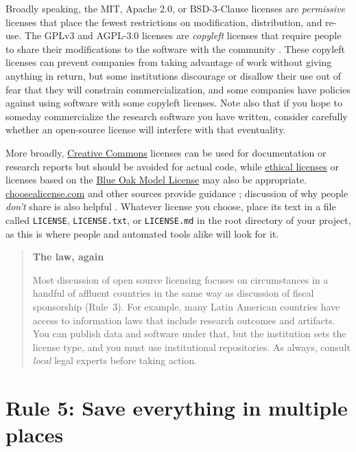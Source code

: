 \documentclass[10pt,letterpaper]{article}
\begin{document}
Broadly speaking,
the MIT, Apache 2.0, or BSD-3-Clause licenses are \emph{permissive} licenses
that place the fewest restrictions on modification, distribution, and re-use.
The GPLv3 and AGPL-3.0 licenses are \emph{copyleft} licenses
that require people to share their modifications to the software with the community \cite{Morin2012}.
These copyleft licenses can prevent companies from taking advantage of work without giving anything in return,
but some institutions discourage or disallow their use out of fear that they will constrain commercialization,
and some companies have policies against using software with some copyleft licenses.
Note also that if you hope to someday commercialize the research software you have written, consider carefully whether an open-source license will interfere with that eventuality.

More broadly,
\href{https://creativecommons.org/}{Creative Commons} licenses can be used for documentation or research reports
but should be avoided for actual code,
while \href{https://ethicalsource.dev/}{ethical licenses}
or licenses based on the \href{https://blueoakcouncil.org/license/1.0.0}{Blue Oak Model License} may also be appropriate.
\href{http://choosealicense.com}{choosealicense.com} and other sources provide guidance \cite{Fogel2020,Fortunato2021};
discussion of why people \emph{don't} share is also helpful \cite{Gomes2022}.
Whatever license you choose,
place its text in a file called \texttt{LICENSE}, \texttt{LICENSE.txt}, or \texttt{LICENSE.md}
in the root directory of your project,
as this is where people and automated tools alike will look for it.

\begin{quote}
  \noindent
  \textbf{The law, again}

  Most discussion of open source licensing focuses on circumstances in a handful of affluent countries
  in the same way as discussion of fiscal sponsorship (Rule~3).
  For example,
  many Latin American countries have access to information laws that include research outcomes and artifacts.
  You can publish data and software under that,
  but the institution sets the license type,
  and you must use institutional repositories.
  As always,
  consult \emph{local} legal experts before taking action.
\end{quote}

\section*{Rule 5: Save everything in multiple places}
\end{document}
